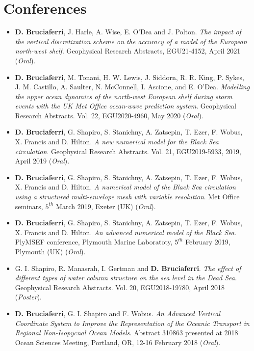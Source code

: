 \documentclass[a4paper, oneside, final]{scrartcl}
\begin{document}
\section{Conferences}
\noindent
\normalsize
\begin{itemize}
\item \textbf{D. Bruciaferri}, J. Harle, A. Wise, E. O'Dea and J. Polton.  \textit{The impact of the vertical discretization scheme on the accuracy of a model of the European north-west shelf}. Geophysical Research Abstracts, EGU21-4152, April 2021 (\textit{Oral}).
\item \textbf{D. Bruciaferri}, M. Tonani, H. W. Lewis, J. Siddorn, R. R. King, P. Sykes, J. M. Castillo, A. Saulter, N. McConnell, I. Ascione, and E. O'Dea.  \textit{Modelling the upper ocean dynamics of the north-west European shelf during storm events with the UK Met Office ocean-wave prediction system}. Geophysical Research Abstracts. Vol. 22, EGU2020-4960, May 2020 (\textit{Oral}).
\item \textbf{D. Bruciaferri}, G. Shapiro, S. Stanichny, A. Zatsepin, T. Ezer, F. Wobus, X. Francis and D. Hilton. \textit{A new numerical model for the Black Sea circulation}. Geophysical Research Abstracts. Vol. 21, EGU2019-5933, 2019, April 2019 (\textit{Oral}).
\item \textbf{D. Bruciaferri}, G. Shapiro, S. Stanichny, A. Zatsepin, T. Ezer, F. Wobus, X. Francis and D. Hilton. \textit{A numerical model of the Black Sea circulation using a structured multi-envelope mesh with variable resolution}. Met Office seminars, $5^{th}$ March 2019, Exeter (UK) (\textit{Oral}).
\item \textbf{D. Bruciaferri}, G. Shapiro, S. Stanichny, A. Zatsepin, T. Ezer, F. Wobus, X. Francis and D. Hilton. \textit{An advanced numerical model of the Black Sea}. PlyMSEF conference, Plymouth Marine Laboratoty, $5^{th}$ February 2019, Plymouth (UK) (\textit{Oral}).
\item G. I. Shapiro, R. Manasrah, I. Gertman and \textbf{D. Bruciaferri}. \textit{The effect of different types of water column structure on the sea level in the Dead Sea}. Geophysical Research Abstracts. Vol. 20, EGU2018-19780, April 2018 (\textit{Poster}).
\item \textbf{D. Bruciaferri}, G. I. Shapiro and F. Wobus. \textit{An Advanced Vertical Coordinate System to Improve the Representation of the Oceanic Transport in Regional Non-Isopycnal Ocean Models}. Abstract 310863 presented at 2018 Ocean Sciences Meeting, Portland, OR, 12-16 February 2018 (\textit{Oral}).

\end{itemize}
\end{document}
